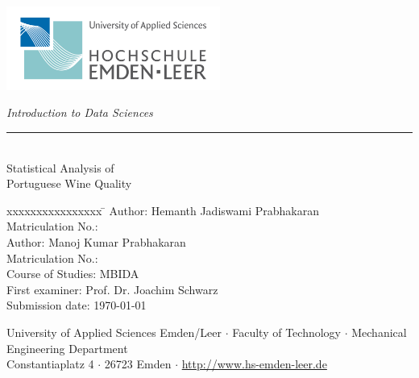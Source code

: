 %
%

\begin{titlepage}
    
    \begin{flushleft} 
        \includegraphics[width=7cm]{General/Logo.png}
    \end{flushleft} 
    
    \begin{flushright}
        \vspace{2cm}
        \LARGE \textsl{Introduction to Data Sciences}\\
        \rule{0.6\textwidth}{0.4pt} ~\\
        \vspace{0.5cm}
        \textsf{\LARGE Statistical Analysis of }\\
        \textsf{\LARGE Portuguese Wine Quality}
    \end{flushright}
    
    \vspace{2cm}
    \large
    \begin{tabbing}
        xxxxxxxxxxxxxxxx \= \kill
        Author: \> Hemanth Jadiswami Prabhakaran \\
        Matriculation No.:  \\
        Author: \> Manoj Kumar Prabhakaran \\
        Matriculation No.:  \\
        Course of Studies: \> MBIDA \\ [0.5cm]
        First examiner: \> Prof. Dr. Joachim Schwarz \\
        Submission date: \> \today \\
    \end{tabbing}
    
    \vspace{1.5cm}
    \small
    \begin{center}
        University of Applied Sciences Emden/Leer $\cdot$ 
        Faculty of Technology $\cdot$ 
        Mechanical Engineering Department \\
        Constantiaplatz 4 $\cdot$ 
        26723 Emden $\cdot$ 
        \url{http://www.hs-emden-leer.de}
    \end{center}
    
\end{titlepage}
